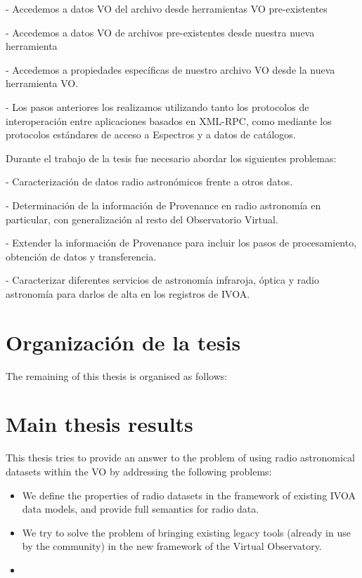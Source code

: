 { 	- Accedemos a datos VO del archivo desde herramientas VO pre-existentes

    - Accedemos a datos VO de archivos pre-existentes desde nuestra nueva 
      herramienta

    - Accedemos a propiedades específicas de nuestro archivo VO desde la
      nueva herramienta VO.

- Los pasos anteriores los realizamos utilizando tanto los protocolos de
  interoperación entre aplicaciones basados en XML-RPC, como mediante los 
  protocolos estándares de acceso a Espectros y a datos de catálogos.

Durante el trabajo de la tesis fue necesario abordar los siguientes problemas:

- Caracterización de datos radio astronómicos frente a otros datos.

- Determinación de la información de Provenance en radio astronomía en 
  particular, con generalización al resto del Observatorio Virtual.

- Extender la información de Provenance para incluir los pasos de procesamiento,
  obtención de datos y transferencia.

- Caracterizar diferentes servicios de astronomía infraroja, óptica y 
  radio astronomía para darlos de alta en los registros de IVOA.


\section*{Organización de la tesis} %
\label{sec:thesis_organisation}

The remaining of this thesis is organised as follows:




\section*{Main thesis results} %
\label{introthesisadvancedresults}

This thesis tries to provide an answer to the problem of using radio
astronomical datasets within the VO by addressing the following
problems:

\begin{itemize}

	\item We define the properties of radio datasets in the
       framework of existing IVOA data models, and provide full
       semantics for radio data.

	\item We try to solve the problem of bringing existing legacy
       tools (already in use by the community) in the new framework of
       the Virtual Observatory.

	\item {}
\end{itemize}

}

